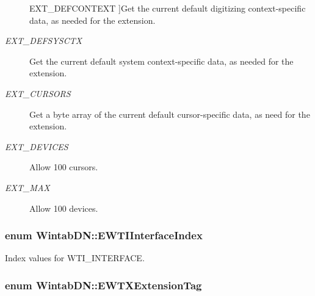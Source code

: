 \begin{Desc}
\begin{description}
{\hypertarget{namespace_wintab_d_n_a52875c234488913934e0d49ac13c438d}{
EXT\_\-DEFCONTEXT}
\label{namespace_wintab_d_n_a52875c234488913934e0d49ac13c438d}
}]Get the current default digitizing context-\/specific data, as needed for the extension. \item[{\em 
\hypertarget{namespace_wintab_d_n_a52875c234488913934e0d49ac13c438d}{
EXT\_\-DEFSYSCTX}
\label{namespace_wintab_d_n_a52875c234488913934e0d49ac13c438d}
}]Get the current default system context-\/specific data, as needed for the extension. \item[{\em 
\hypertarget{namespace_wintab_d_n_a52875c234488913934e0d49ac13c438d}{
EXT\_\-CURSORS}
\label{namespace_wintab_d_n_a52875c234488913934e0d49ac13c438d}
}]Get a byte array of the current default cursor-\/specific data, as need for the extension. \item[{\em 
\hypertarget{namespace_wintab_d_n_a52875c234488913934e0d49ac13c438d}{
EXT\_\-DEVICES}
\label{namespace_wintab_d_n_a52875c234488913934e0d49ac13c438d}
}]Allow 100 cursors. \item[{\em 
\hypertarget{namespace_wintab_d_n_a52875c234488913934e0d49ac13c438d}{
EXT\_\-MAX}
\label{namespace_wintab_d_n_a52875c234488913934e0d49ac13c438d}
}]Allow 100 devices. \end{description}
\end{Desc}

\hypertarget{namespace_wintab_d_n_a9db915754a02c42282c3766bfbafabe4}{
\subsubsection[{EWTIInterfaceIndex}]{\setlength{\rightskip}{0pt plus 5cm}enum {\bf WintabDN::EWTIInterfaceIndex}}}
\label{namespace_wintab_d_n_a9db915754a02c42282c3766bfbafabe4}


Index values for WTI\_\-INTERFACE. 

\hypertarget{namespace_wintab_d_n_a303ef868b8887dc43872ddac8a7d059b}{
\subsubsection[{EWTXExtensionTag}]{\setlength{\rightskip}{0pt plus 5cm}enum {\bf WintabDN::EWTXExtensionTag}}}
\label{namespace_wintab_d_n_a303ef868b8887dc43872ddac8a7d059b}


